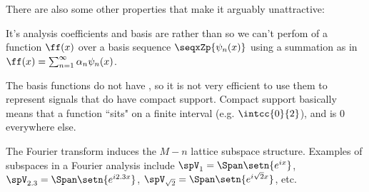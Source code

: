 There are also some other properties that make it arguably unattractive:
  \begin{liste}
    \item It's analysis coefficients and basis are  rather than  so we can't perfom  of
          a function $\ff(x)$ over a basis sequence $\seqxZp{\psi_n(x)}$ using
          a summation as in $\ff(x)=\sum_{n=1}^\infty \alpha_n\psi_n(x)$.
    \item The basis functions do not have , so it is not very efficient to use them to represent
          signals that do have compact support. Compact support basically means that a function ``sits" on a finite
          interval (e.g. $\intcc{0}{2}$), and is $0$ everywhere else.
  \end{liste}
The Fourier transform induces the $M-n$ lattice subspace structure.
Examples of subspaces in a Fourier analysis include $\spV_1=\Span\setn{e^{ix}}$, 
  $\spV_{2.3}=\Span\setn{e^{i2.3x}}$, $\spV_{\sqrt{2}}=\Span\setn{e^{i\sqrt{2}x}}$, etc.

